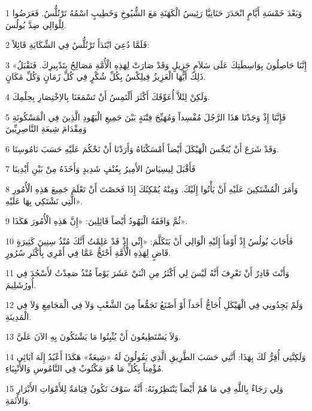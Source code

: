 \par 1 وَبَعْدَ خَمْسَةِ أَيَّامٍ انْحَدَرَ حَنَانِيَّا رَئِيسُ الْكَهَنَةِ مَعَ الشُّيُوخِ وَخَطِيبٍ اسْمُهُ تَرْتُلُّسُ. فَعَرَضُوا لِلْوَالِي ضِدَّ بُولُسَ.
\par 2 فَلَمَّا دُعِيَ ابْتَدَأَ تَرْتُلُّسُ فِي الشِّكَايَةِ قَائِلاً:
\par 3 «إِنَّنَا حَاصِلُونَ بِوَاسِطَتِكَ عَلَى سَلاَمٍ جَزِيلٍ وَقَدْ صَارَتْ لِهَذِهِ الْأُمَّةِ مَصَالِحُ بِتَدْبِيرِكَ. فَنَقْبَلُ ذَلِكَ أَيُّهَا الْعَزِيزُ فِيلِكْسُ بِكُلِّ شُكْرٍ فِي كُلِّ زَمَانٍ وَكُلِّ مَكَانٍ.
\par 4 وَلَكِنْ لِئَلاَّ أُعَوِّقَكَ أَكْثَرَ أَلْتَمِسُ أَنْ تَسْمَعَنَا بِالاِخْتِصَارِ بِحِلْمِكَ.
\par 5 فَإِنَّنَا إِذْ وَجَدْنَا هَذَا الرَّجُلَ مُفْسِداً وَمُهَيِّجَ فِتْنَةٍ بَيْنَ جَمِيعِ الْيَهُودِ الَّذِينَ فِي الْمَسْكُونَةِ وَمِقْدَامَ شِيعَةِ النَّاصِرِيِّينَ
\par 6 وَقَدْ شَرَعَ أَنْ يُنَجِّسَ الْهَيْكَلَ أَيْضاً أَمْسَكْنَاهُ وَأَرَدْنَا أَنْ نَحْكُمَ عَلَيْهِ حَسَبَ نَامُوسِنَا.
\par 7 فَأَقْبَلَ لِيسِيَاسُ الأَمِيرُ بِعُنْفٍ شَدِيدٍ وَأَخَذَهُ مِنْ بَيْنِ أَيْدِينَا
\par 8 وَأَمَرَ الْمُشْتَكِينَ عَلَيْهِ أَنْ يَأْتُوا إِلَيْكَ. وَمِنْهُ يُمْكِنُكَ إِذَا فَحَصْتَ أَنْ تَعْلَمَ جَمِيعَ هَذِهِ الْأُمُورِ الَّتِي نَشْتَكِي بِهَا عَلَيْهِ».
\par 9 ثُمَّ وَافَقَهُ الْيَهُودُ أَيْضاً قَائِلِينَ: «إِنَّ هَذِهِ الْأُمُورَ هَكَذَا».
\par 10 فَأَجَابَ بُولُسُ إِذْ أَوْمَأَ إِلَيْهِ الْوَالِي أَنْ يَتَكَلَّمَ: «إِنِّي إِذْ قَدْ عَلِمْتُ أَنَّكَ مُنْذُ سِنِينَ كَثِيرَةٍ قَاضٍ لِهَذِهِ الْأُمَّةِ أَحْتَجُّ عَمَّا فِي أَمْرِي بِأَكْثَرِ سُرُورٍ.
\par 11 وَأَنْتَ قَادِرٌ أَنْ تَعْرِفَ أَنَّهُ لَيْسَ لِي أَكْثَرُ مِنِ اثْنَيْ عَشَرَ يَوْماً مُنْذُ صَعِدْتُ لأَسْجُدَ فِي أُورُشَلِيمَ.
\par 12 وَلَمْ يَجِدُونِي فِي الْهَيْكَلِ أُحَاجُّ أَحَداً أَوْ أَصْنَعُ تَجَمُّعاً مِنَ الشَّعْبِ وَلاَ فِي الْمَجَامِعِ وَلاَ فِي الْمَدِينَةِ.
\par 13 وَلاَ يَسْتَطِيعُونَ أَنْ يُثْبِتُوا مَا يَشْتَكُونَ بِهِ الآنَ عَلَيَّ.
\par 14 وَلَكِنَّنِي أُقِرُّ لَكَ بِهَذَا: أَنَّنِي حَسَبَ الطَّرِيقِ الَّذِي يَقُولُونَ لَهُ «شِيعَةٌ» هَكَذَا أَعْبُدُ إِلَهَ آبَائِي مُؤْمِناً بِكُلِّ مَا هُوَ مَكْتُوبٌ فِي النَّامُوسِ وَالأَنْبِيَاءِ.
\par 15 وَلِي رَجَاءٌ بِاللَّهِ فِي مَا هُمْ أَيْضاً يَنْتَظِرُونَهُ: أَنَّهُ سَوْفَ تَكُونُ قِيَامَةٌ لِلأَمْوَاتِ الأَبْرَارِ وَالأَثَمَةِ.

